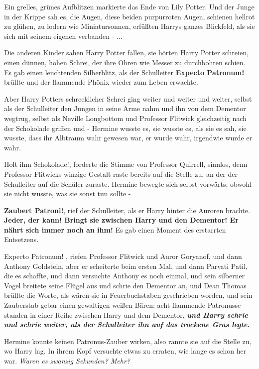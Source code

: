 Ein grelles, grünes Aufblitzen markierte das Ende von Lily Potter. Und der Junge
in der Krippe sah es, die Augen, diese beiden purpurroten Augen, schienen
hellrot zu glühen, zu lodern wie Miniatursonnen, erfüllten Harrys ganzes
Blickfeld, als sie sich mit seinem eigenen verbanden - ...

Die anderen Kinder sahen Harry Potter fallen, sie hörten Harry Potter schreien,
einen dünnen, hohen Schrei, der ihre Ohren wie Messer zu durchbohren schien. Es
gab einen leuchtenden Silberblitz, als der Schulleiter \glqq{}\textbf{Expecto
Patronum!}\grqq{} brüllte und der flammende Phönix wieder zum Leben erwachte.

Aber Harry Potters schrecklicher Schrei ging weiter und weiter und weiter,
selbst als der Schulleiter den Jungen in seine Arme nahm und ihn von dem
Dementor wegtrug, selbst als Neville Longbottom und Professor Flitwick
gleichzeitig nach der Schokolade griffen und - Hermine wusste es, sie wusste es,
als sie es sah, sie wusste, dass ihr Albtraum wahr gewesen war, er wurde wahr,
irgendwie wurde er wahr.

\glqq{}Holt ihm Schokolade!\grqq{}, forderte die Stimme von Professor Quirrell,
sinnlos, denn Professor Flitwicks winzige Gestalt raste bereits auf die Stelle
zu, an der der Schulleiter auf die Schüler zuraste. Hermine bewegte sich selbst
vorwärts, obwohl sie nicht wusste, was sie sonst tun sollte -

\glqq{}\textbf{Zaubert Patroni!}\grqq{}, rief der Schulleiter, als er Harry
hinter die Auroren brachte. \glqq{}\textbf{Jeder, der kann! Bringt sie zwischen
Harry und den Dementor! Er nährt sich immer noch an ihm!}\grqq{} Es gab einen Moment
des erstarrten Entsetzens.

\glqq{}Expecto Patronum! \glqq{}, riefen Professor Flitwick und Auror Goryanof,
und dann Anthony Goldstein, aber er scheiterte beim ersten Mal, und dann Parvati
Patil, die es schaffte, und dann versuchte Anthony es noch einmal, und sein
silberner Vogel breitete seine Flügel aus und schrie den Dementor an, und Dean
Thomas brüllte die Worte, als wären sie in Feuerbuchstaben geschrieben worden,
und sein Zauberstab gebar einen gewaltigen weißen Bären; acht flammende
Patronusse standen in einer Reihe zwischen Harry und dem Dementor,
\textbf{\emph{und Harry schrie und schrie weiter, als der Schulleiter ihn auf
das trockene Gras legte.}}

Hermine konnte keinen Patronus-Zauber wirken, also rannte sie auf die Stelle zu,
wo Harry lag. In ihrem Kopf versuchte etwas zu erraten, wie lange es schon her
war.
\emph{Waren es zwanzig Sekunden? Mehr?}

